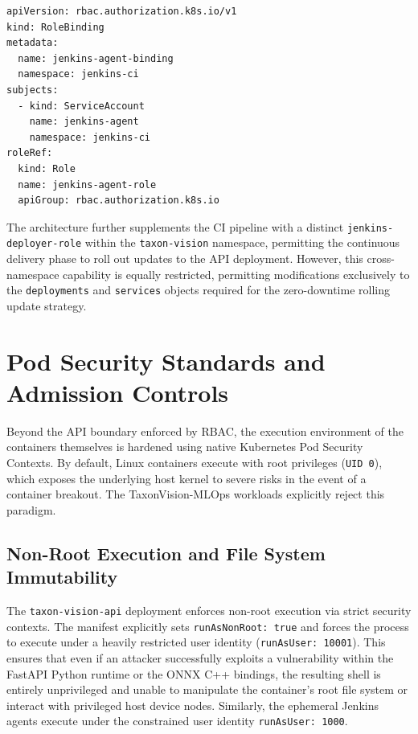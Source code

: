 \begin{listing}[H]
\begin{verbatim}
apiVersion: rbac.authorization.k8s.io/v1
kind: RoleBinding
metadata:
  name: jenkins-agent-binding
  namespace: jenkins-ci
subjects:
  - kind: ServiceAccount
    name: jenkins-agent
    namespace: jenkins-ci
roleRef:
  kind: Role
  name: jenkins-agent-role
  apiGroup: rbac.authorization.k8s.io
\end{verbatim}
\caption{RoleBinding binding the identity to the constrained permissions within the namespace.}
\label{lst:rolebinding}
\end{listing}

The architecture further supplements the CI pipeline with a distinct \texttt{jenkins-deployer-role} within the \texttt{taxon-vision} namespace, permitting the continuous delivery phase to roll out updates to the API deployment. However, this cross-namespace capability is equally restricted, permitting modifications exclusively to the \texttt{deployments} and \texttt{services} objects required for the zero-downtime rolling update strategy.

\section{Pod Security Standards and Admission Controls}
\label{sec:pod_security_standards}

Beyond the API boundary enforced by RBAC, the execution environment of the containers themselves is hardened using native Kubernetes Pod Security Contexts. By default, Linux containers execute with root privileges (\texttt{UID 0}), which exposes the underlying host kernel to severe risks in the event of a container breakout. The TaxonVision-MLOps workloads explicitly reject this paradigm.

\subsection{Non-Root Execution and File System Immutability}
The \texttt{taxon-vision-api} deployment enforces non-root execution via strict security contexts. The manifest explicitly sets \texttt{runAsNonRoot: true} and forces the process to execute under a heavily restricted user identity (\texttt{runAsUser: 10001}). This ensures that even if an attacker successfully exploits a vulnerability within the FastAPI Python runtime or the ONNX C++ bindings, the resulting shell is entirely unprivileged and unable to manipulate the container's root file system or interact with privileged host device nodes. Similarly, the ephemeral Jenkins agents execute under the constrained user identity \texttt{runAsUser: 1000}.

